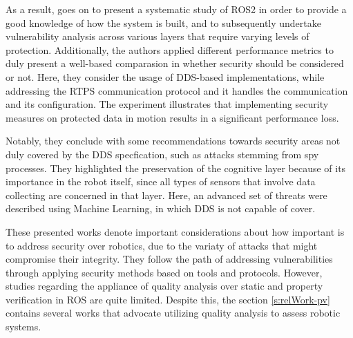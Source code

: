 As a result, \citeauthor{diluoffo2018robot} goes on to present a systematic study of ROS2 in order to provide a good knowledge of how the system is built, and to subsequently undertake vulnerability analysis across various layers that require varying levels of protection. Additionally, the authors applied different performance metrics to duly present a well-based comparasion in whether security should be considered or not. Here, they consider the usage of DDS-based implementations, while addressing the RTPS communication protocol and it handles the communication and its configuration. The experiment illustrates that implementing security measures on protected data in motion results in a significant performance loss. 

Notably, they conclude with some recommendations towards security areas not duly covered by the DDS specfication, such as attacks stemming from
spy processes. They highlighted the preservation of the cognitive layer because of its importance in the robot itself, since all types of sensors that involve data collecting are concerned in that layer. Here, an advanced set of threats were described using Machine Learning, in which DDS is not capable of cover.

These presented works denote important considerations about how important is to address security over robotics, due to the variaty of attacks that might compromise their integrity. They follow the path of addressing vulnerabilities through applying security methods based on tools and protocols. However, studies regarding the appliance of quality analysis over static and property verification in ROS are quite limited. Despite this, the section \ref{s:relWork-pv} contains several works that advocate utilizing quality analysis to assess robotic systems.